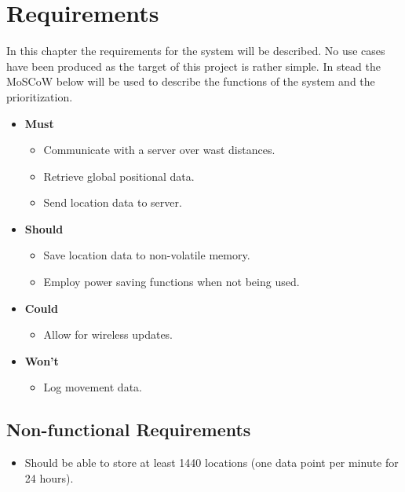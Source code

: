 
\chapter{Requirements}
\label{chap:requirements}
In this chapter the requirements for the system will be described.
No use cases have been produced as the target of this project is rather simple.
In stead the MoSCoW below will be used to describe the functions of the system and the prioritization.

\begin{itemize}
	\item \textbf{Must}
	\begin{itemize}
		\item Communicate with a server over wast distances.
		\item Retrieve global positional data.
		\item Send location data to server.
	\end{itemize}
	\item \textbf{Should}
	\begin{itemize}
		\item Save location data to non-volatile memory.
		\item Employ power saving functions when not being used.
	\end{itemize}
	\item \textbf{Could}
	\begin{itemize}
		\item Allow for wireless updates.
	\end{itemize}
	\item \textbf{Won't}
	\begin{itemize}
		\item Log movement data.
	\end{itemize}
\end{itemize}

\section{Non-functional Requirements}
\begin{itemize}
	\item Should be able to store at least \num{1440} locations (one data point per minute for \num{24} hours).
\end{itemize}